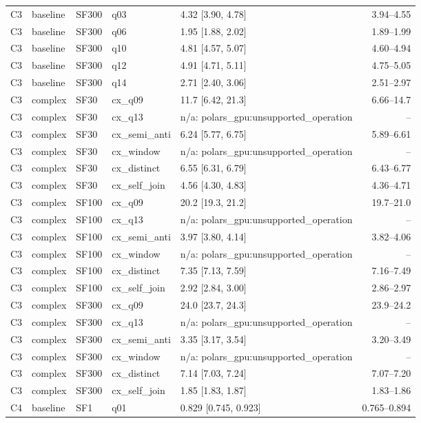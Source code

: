 \begin{longtable}{lllllr}
C3 & baseline & SF300 & q03 & 4.32 [3.90, 4.78] & 3.94--4.55 \\
C3 & baseline & SF300 & q06 & 1.95 [1.88, 2.02] & 1.89--1.99 \\
C3 & baseline & SF300 & q10 & 4.81 [4.57, 5.07] & 4.60--4.94 \\
C3 & baseline & SF300 & q12 & 4.91 [4.71, 5.11] & 4.75--5.05 \\
C3 & baseline & SF300 & q14 & 2.71 [2.40, 3.06] & 2.51--2.97 \\
C3 & complex & SF30 & cx\_q09 & 11.7 [6.42, 21.3] & 6.66--14.7 \\
C3 & complex & SF30 & cx\_q13 & n/a: polars\_gpu:unsupported\_operation & -- \\
C3 & complex & SF30 & cx\_semi\_anti & 6.24 [5.77, 6.75] & 5.89--6.61 \\
C3 & complex & SF30 & cx\_window & n/a: polars\_gpu:unsupported\_operation & -- \\
C3 & complex & SF30 & cx\_distinct & 6.55 [6.31, 6.79] & 6.43--6.77 \\
C3 & complex & SF30 & cx\_self\_join & 4.56 [4.30, 4.83] & 4.36--4.71 \\
C3 & complex & SF100 & cx\_q09 & 20.2 [19.3, 21.2] & 19.7--21.0 \\
C3 & complex & SF100 & cx\_q13 & n/a: polars\_gpu:unsupported\_operation & -- \\
C3 & complex & SF100 & cx\_semi\_anti & 3.97 [3.80, 4.14] & 3.82--4.06 \\
C3 & complex & SF100 & cx\_window & n/a: polars\_gpu:unsupported\_operation & -- \\
C3 & complex & SF100 & cx\_distinct & 7.35 [7.13, 7.59] & 7.16--7.49 \\
C3 & complex & SF100 & cx\_self\_join & 2.92 [2.84, 3.00] & 2.86--2.97 \\
C3 & complex & SF300 & cx\_q09 & 24.0 [23.7, 24.3] & 23.9--24.2 \\
C3 & complex & SF300 & cx\_q13 & n/a: polars\_gpu:unsupported\_operation & -- \\
C3 & complex & SF300 & cx\_semi\_anti & 3.35 [3.17, 3.54] & 3.20--3.49 \\
C3 & complex & SF300 & cx\_window & n/a: polars\_gpu:unsupported\_operation & -- \\
C3 & complex & SF300 & cx\_distinct & 7.14 [7.03, 7.24] & 7.07--7.20 \\
C3 & complex & SF300 & cx\_self\_join & 1.85 [1.83, 1.87] & 1.83--1.86 \\
C4 & baseline & SF1 & q01 & 0.829 [0.745, 0.923] & 0.765--0.894 \\

\end{longtable}
